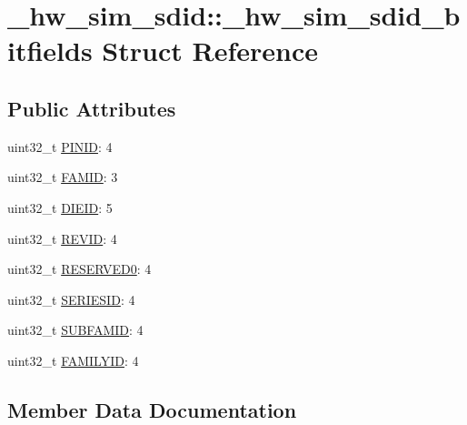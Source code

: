 \hypertarget{struct__hw__sim__sdid_1_1__hw__sim__sdid__bitfields}{}\section{\+\_\+hw\+\_\+sim\+\_\+sdid\+:\+:\+\_\+hw\+\_\+sim\+\_\+sdid\+\_\+bitfields Struct Reference}
\label{struct__hw__sim__sdid_1_1__hw__sim__sdid__bitfields}
\subsection*{Public Attributes}
\begin{DoxyCompactItemize}
\item 
uint32\+\_\+t \hyperlink{struct__hw__sim__sdid_1_1__hw__sim__sdid__bitfields_a6ecc49757cf9a3d34f837652de196bf8}{P\+I\+N\+ID}\+: 4
\item 
uint32\+\_\+t \hyperlink{struct__hw__sim__sdid_1_1__hw__sim__sdid__bitfields_a5e783452ca00641ceb9d96b394ff84c9}{F\+A\+M\+ID}\+: 3
\item 
uint32\+\_\+t \hyperlink{struct__hw__sim__sdid_1_1__hw__sim__sdid__bitfields_a02abe0c9b3b3e900a5a4490d19343fd1}{D\+I\+E\+ID}\+: 5
\item 
uint32\+\_\+t \hyperlink{struct__hw__sim__sdid_1_1__hw__sim__sdid__bitfields_a52d3fa26a9b63657217c08608ed72b8a}{R\+E\+V\+ID}\+: 4
\item 
uint32\+\_\+t \hyperlink{struct__hw__sim__sdid_1_1__hw__sim__sdid__bitfields_ad2bf1c8d19b42bc7e7a09e85f8602d1c}{R\+E\+S\+E\+R\+V\+E\+D0}\+: 4
\item 
uint32\+\_\+t \hyperlink{struct__hw__sim__sdid_1_1__hw__sim__sdid__bitfields_ac21b2ccfca55b7f41d9f964053c24f9a}{S\+E\+R\+I\+E\+S\+ID}\+: 4
\item 
uint32\+\_\+t \hyperlink{struct__hw__sim__sdid_1_1__hw__sim__sdid__bitfields_a8cff05bedb83af0377fdafc917709615}{S\+U\+B\+F\+A\+M\+ID}\+: 4
\item 
uint32\+\_\+t \hyperlink{struct__hw__sim__sdid_1_1__hw__sim__sdid__bitfields_a4bb97279670d3dd089b18c122bded4ff}{F\+A\+M\+I\+L\+Y\+ID}\+: 4
\end{DoxyCompactItemize}


\subsection{Member Data Documentation}
